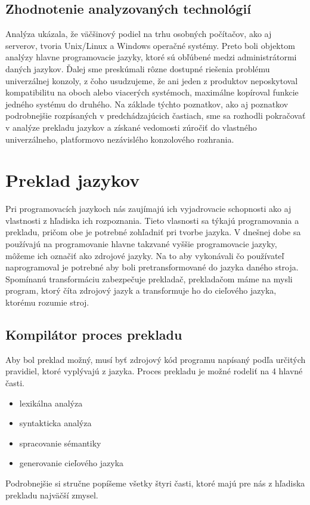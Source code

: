 \subsection{Zhodnotenie analyzovaných technológií}
\indent Analýza ukázala, že väčšinový podiel na trhu osobných počítačov, ako aj serverov, tvoria Unix/Linux a Windows operačné systémy. Preto boli objektom analýzy hlavne programovacie jazyky, ktoré sú obľúbené medzi administrátormi daných jazykov. Ďalej sme preskúmali rôzne dostupné riešenia problému univerzálnej konzoly, z čoho usudzujeme, že ani jeden z produktov neposkytoval kompatibilitu na oboch alebo viacerých systémoch, maximálne kopíroval funkcie jedného systému do druhého. Na základe týchto poznatkov, ako aj poznatkov podrobnejšie rozpísaných v predchádzajúcich častiach, sme sa rozhodli pokračovať v analýze prekladu jazykov a získané vedomosti zúročiť do vlastného univerzálneho, platformovo nezávislého konzolového rozhrania.


\section{Preklad jazykov}
\indent Pri programovacích jazykoch nás zaujímajú ich vyjadrovacie schopnosti ako aj vlastnosti z hľadiska ich rozpoznania. Tieto vlasnosti sa týkajú programovania a prekladu, pričom obe je potrebné zohľadniť pri tvorbe jazyka. V dnešnej dobe sa používajú na programovanie hlavne takzvané vyššie programovacie jazyky, môžeme ich označiť ako zdrojové jazyky. Na to aby vykonávali čo používateľ naprogramoval je potrebné aby boli pretransformované do jazyka daného stroja. Spomínanú transformáciu zabezpečuje prekladač, prekladačom máme na mysli program, ktorý číta zdrojový jazyk a transformuje ho do cieľového jazyka, ktorému rozumie stroj.\cite{gram}

\subsection{Kompilátor proces prekladu}
Aby bol preklad možný, musí byť zdrojový kód programu napísaný podľa určitých pravidiel, ktoré vyplývajú z jazyka. Proces prekladu je možné rodeliť na 4 hlavné časti.
\begin{itemize}
	\item lexikálna analýza
	\item syntakticka analýza
	\item spracovanie sémantiky
	\item generovanie cieľového jazyka
\end{itemize}
\indent Podrobnejšie si stručne popíšeme všetky štyri časti, ktoré majú pre nás z hľadiska prekladu najväčší zmysel.
\newline
